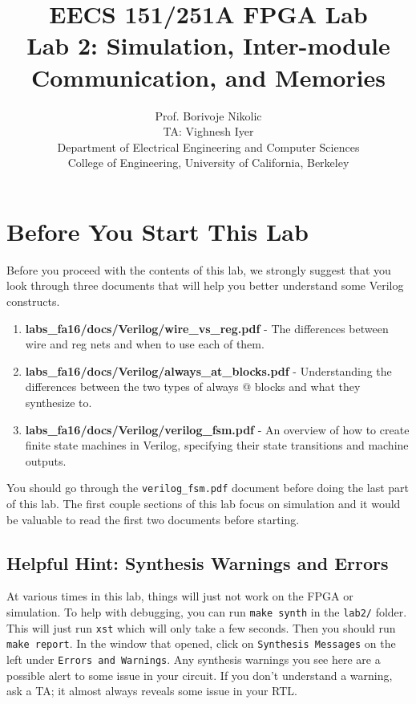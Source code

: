 \documentclass[11pt]{article}
\begin{document}
\title{EECS 151/251A FPGA Lab\\
Lab 2: Simulation, Inter-module Communication, and Memories}

\author{Prof. Borivoje Nikolic \\
TA: Vighnesh Iyer \\Department of Electrical Engineering and Computer Sciences\\
College of Engineering, University of California, Berkeley}
\date{}
\maketitle

\section{Before You Start This Lab}

Before you proceed with the contents of this lab, we strongly suggest that you look through three documents that will help you better understand some Verilog constructs.

\begin{enumerate}
	\item \textbf{labs\_fa16/docs/Verilog/wire\_vs\_reg.pdf} - The differences between wire and reg nets and when to use each of them.
	
	\item \textbf{labs\_fa16/docs/Verilog/always\_at\_blocks.pdf} - Understanding the differences between the two types of always @ blocks and what they synthesize to.
	
	\item \textbf{labs\_fa16/docs/Verilog/verilog\_fsm.pdf} - An overview of how to create finite state machines in Verilog, specifying their state transitions and machine outputs.

\end{enumerate}

You should go through the \verb|verilog_fsm.pdf| document before doing the last part of this lab. The first couple sections of this lab focus on simulation and it would be valuable to read the first two documents before starting.

\subsection{Helpful Hint: Synthesis Warnings and Errors}
At various times in this lab, things will just not work on the FPGA or simulation. To help with debugging, you can run \verb|make synth| in the \verb|lab2/| folder. This will just run \verb|xst| which will only take a few seconds. Then you should run \verb|make report|. In the window that opened, click on \verb|Synthesis Messages| on the left under \verb|Errors and Warnings|. Any synthesis warnings you see here are a possible alert to some issue in your circuit. If you don't understand a warning, ask a TA; it almost always reveals some issue in your RTL.
\end{document}
